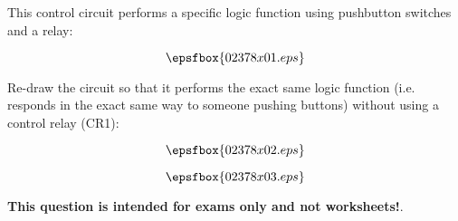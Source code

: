 

This control circuit performs a specific logic function using pushbutton switches and a relay:

$$\epsfbox{02378x01.eps}$$

Re-draw the circuit so that it performs the exact same logic function (i.e. responds in the exact same way to someone pushing buttons) without using a control relay (CR1):

$$\epsfbox{02378x02.eps}$$







$$\epsfbox{02378x03.eps}$$







{\bf This question is intended for exams only and not worksheets!}.



